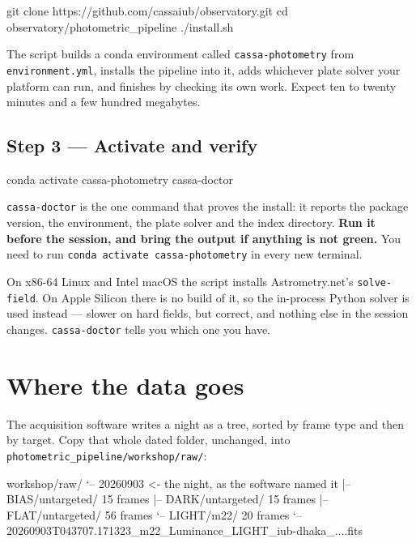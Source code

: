 \documentclass[11pt,a4paper]{article}
\newcommand{\cm}[1]{\texttt{\small #1}}
\newcommand{\cmt}[1]{\textcolor{inkfaint}{#1}}
\begin{document}
\begin{cmd}
\begin{cmdtext}
git clone https://github.com/cassaiub/observatory.git
cd observatory/photometric_pipeline
./install.sh
\end{cmdtext}
\end{cmd}

The script builds a conda environment called \cm{cassa-photometry} from
\cm{environment.yml}, installs the pipeline into it, adds whichever plate solver
your platform can run, and finishes by checking its own work. Expect ten to
twenty minutes and a few hundred megabytes.

\subsection{Step 3 --- Activate and verify}

\begin{cmd}
\begin{cmdtext}
conda activate cassa-photometry
cassa-doctor
\end{cmdtext}
\end{cmd}

\cm{cassa-doctor} is the one command that proves the install: it reports the
package version, the environment, the plate solver and the index directory.
\textbf{Run it before the session, and bring the output if anything is not
green.} You need to run \cm{conda activate cassa-photometry} in every new
terminal.

\begin{note}
On x86-64 Linux and Intel macOS the script installs Astrometry.net's
\cm{solve-field}. On Apple Silicon there is no build of it, so the in-process
Python solver is used instead --- slower on hard fields, but correct, and
nothing else in the session changes. \cm{cassa-doctor} tells you which one you
have.
\end{note}

\section{Where the data goes}
The acquisition software writes a night as a tree, sorted by frame type and then by target.
Copy that whole dated folder, unchanged, into \cm{photometric\_pipeline/workshop/raw/}:

\begin{cmd}
\begin{cmdtext}
workshop/raw/
`-- 20260903                    \cmt{<- the night, as the software named it}
    |-- BIAS/untargeted/          \cmt{15 frames}
    |-- DARK/untargeted/          \cmt{15 frames}
    |-- FLAT/untargeted/          \cmt{56 frames}
    `-- LIGHT/m22/                \cmt{20 frames}
        `-- 20260903T043707.171323_m22_Luminance_LIGHT_iub-dhaka_....fits
\end{cmdtext}
\end{cmd}
\end{document}
